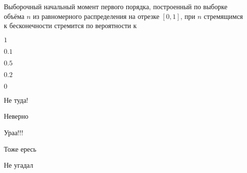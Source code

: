 
\begin{question}
Выборочный начальный момент первого порядка, построенный по выборке
объёма \(n\) из равномерного распределения на отрезке \([0,1]\), при
\(n\) стремящимся к бесконечности стремится по вероятности к
\begin{answerlist}
  \item \(1\)
  \item \(0.1\)
  \item \(0.5\)
  \item \(0.2\)
  \item \(0\)
\end{answerlist}
\end{question}

\begin{solution}
\begin{answerlist}
  \item Не туда!
  \item Неверно
  \item Ураа!!!
  \item Тоже ересь
  \item Не угадал
\end{answerlist}
\end{solution}


